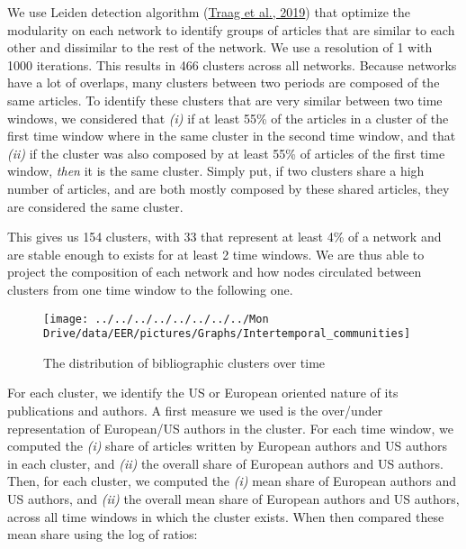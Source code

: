\documentclass[
  12pt,
  onecolumn]{article}
\begin{document}
We use Leiden detection algorithm
(\protect\hyperlink{ref-traag2019}{Traag et al., 2019}) that optimize
the modularity on each network to identify groups of articles that are
similar to each other and dissimilar to the rest of the network. We use
a resolution of 1 with 1000 iterations. This results in 466 clusters
across all networks. Because networks have a lot of overlaps, many
clusters between two periods are composed of the same articles. To
identify these clusters that are very similar between two time windows,
we considered that \emph{(i)} if at least 55\% of the articles in a
cluster of the first time window where in the same cluster in the second
time window, and that \emph{(ii)} if the cluster was also composed by at
least 55\% of articles of the first time window, \emph{then} it is the
same cluster. Simply put, if two clusters share a high number of
articles, and are both mostly composed by these shared articles, they
are considered the same cluster.

This gives us 154 clusters, with 33 that represent at least 4\% of a
network and are stable enough to exists for at least 2 time windows. We
are thus able to project the composition of each network and how nodes
circulated between clusters from one time window to the following one.

\begin{figure}[h]

{\centering \texttt{[image: ../../../../../../../../Mon Drive/data/EER/pictures/Graphs/Intertemporal\_communities]} 

}

\caption{The distribution of bibliographic clusters over time}\label{fig:plot-cluster-flow}
\end{figure}

For each cluster, we identify the US or European oriented nature of its
publications and authors. A first measure we used is the over/under
representation of European/US authors in the cluster. For each time
window, we computed the \emph{(i)} share of articles written by European
authors and US authors in each cluster, and \emph{(ii)} the overall
share of European authors and US authors. Then, for each cluster, we
computed the \emph{(i)} mean share of European authors and US authors,
and \emph{(ii)} the overall mean share of European authors and US
authors, across all time windows in which the cluster exists. When then
compared these mean share using the log of ratios:

\bigskip
\end{document}

